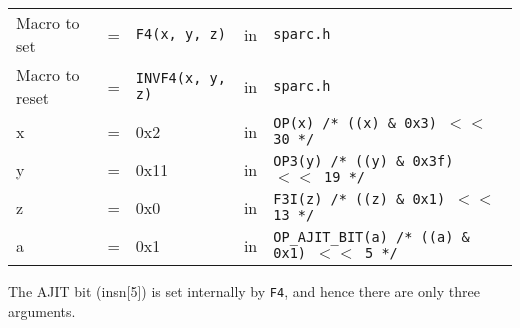 \begin{enumerate}
  \begin{tabular}[h]{lclcl}
    Macro to set  &=& \texttt{F4(x, y, z)} &in& \texttt{sparc.h}     \\
    Macro to reset  &=& \texttt{INVF4(x, y, z)} &in& \texttt{sparc.h}     \\
    x &=& 0x2      &in& \texttt{OP(x)  /* ((x) \& 0x3)  $<<$ 30 */} \\
    y &=& 0x11     &in& \texttt{OP3(y) /* ((y) \& 0x3f) $<<$ 19 */} \\
    z &=& 0x0      &in& \texttt{F3I(z) /* ((z) \& 0x1)  $<<$ 13 */} \\
    a &=& 0x1      &in& \texttt{OP\_AJIT\_BIT(a) /* ((a) \& 0x1)  $<<$ 5 */}
  \end{tabular}

  The AJIT bit  (insn[5]) is set internally by  \texttt{F4}, and hence
  there are only three arguments.


\end{enumerate}
